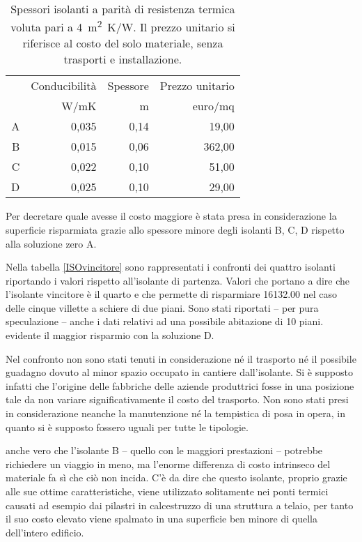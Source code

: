 \begin{table}[htb]
\centering
\caption[Confronto degli spessori degli isolanti a parità di resistenza termica]{Spessori isolanti a parità di resistenza termica voluta pari a \SI{4}{m^2K/W}. Il prezzo unitario si riferisce al costo del solo materiale, senza trasporti e installazione.}
\label{tab:Isolanti}
\begin{tabular}{@{}rrrr@{}}
\toprule
  & Conducibilità & Spessore & Prezzo unitario \\ 
  & W/mK          & m        & euro/mq            \\ \midrule
A & 0,035         & 0,14     & 19,00           \\
B & 0,015         & 0,06     & 362,00          \\
C & 0,022         & 0,10     & 51,00           \\
D & 0,025         & 0,10     & 29,00           \\ \bottomrule
\end{tabular}%
\end{table}

Per decretare quale avesse il costo maggiore è stata presa in considerazione la superficie risparmiata grazie allo spessore minore degli isolanti B, C, D rispetto alla soluzione zero A.


Nella tabella \ref{ISOvincitore} sono rappresentati i confronti dei quattro isolanti riportando i valori rispetto all'isolante di partenza.
Valori che portano a dire che l'isolante vincitore è il quarto e che permette di risparmiare \SI{16132.00}{\teuro} nel caso delle cinque villette a schiere di due piani.
Sono stati riportati -- per pura speculazione -- anche i dati relativi ad una possibile abitazione di 10 piani.
\e evidente il maggior risparmio con la soluzione D.

Nel confronto non sono stati tenuti in considerazione né il trasporto né il possibile guadagno dovuto al minor spazio occupato in cantiere dall'isolante.
Si è supposto infatti che l'origine delle fabbriche delle aziende produttrici fosse in una posizione tale da non variare significativamente il costo del trasporto. 
Non sono stati presi in considerazione neanche la manutenzione né la tempistica di posa in opera, in quanto si è supposto fossero uguali per tutte le tipologie.

\e anche vero che l'isolante B -- quello con le maggiori prestazioni -- potrebbe richiedere un viaggio in meno, ma l'enorme differenza di costo intrinseco del materiale fa sì che ciò non incida.
C'è da dire che questo isolante, proprio grazie alle sue ottime caratteristiche, viene utilizzato solitamente nei ponti termici causati ad esempio dai pilastri in calcestruzzo di una struttura a telaio, per tanto il suo costo elevato viene spalmato in una superficie ben minore di quella dell'intero edificio.